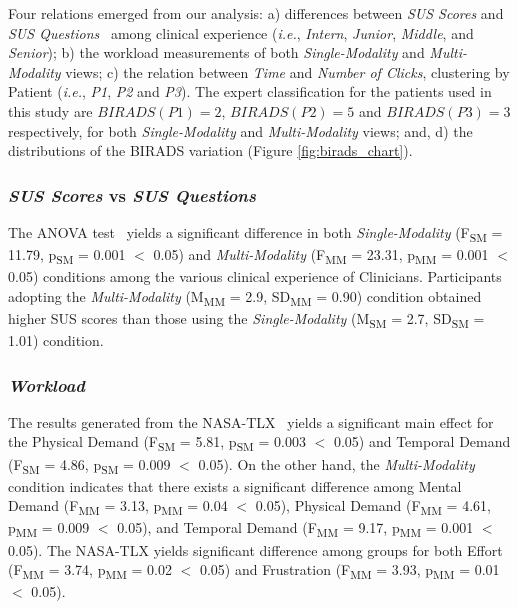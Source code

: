 Four relations emerged from our analysis:
a) differences between \textit{SUS Scores} and \textit{SUS Questions}~\cite{Tyllinen:2016:WNN:2858036.2858570} among clinical experience ({\em i.e.}, \textit{Intern}, \textit{Junior}, \textit{Middle}, and \textit{Senior});
b) the workload measurements of both \textit{Single-Modality} and \textit{Multi-Modality} views;
c) the relation between \textit{Time} and \textit{Number of Clicks}, clustering by Patient ({\em i.e.}, \textit{P1}, \textit{P2} and \textit{P3}).
The expert classification for the patients used in this study are $BIRADS(P1) = 2$, $BIRADS(P2) = 5$ and $BIRADS(P3) = 3$ respectively, for both \textit{Single-Modality} and \textit{Multi-Modality} views; and, d) the distributions of the BIRADS variation (Figure \ref{fig:birads_chart}).

\subsubsection{\textit{SUS Scores} vs \textit{SUS Questions}}

The ANOVA test\footnotemark[6]~\cite{Wobbrock:2011:ART:1978942.1978963} yields a significant difference in both \textit{Single-Modality} (F\textsubscript{SM} = 11.79, p\textsubscript{SM} = 0.001 $<$ 0.05) and \textit{Multi-Modality} (F\textsubscript{MM} = 23.31, p\textsubscript{MM} = 0.001 $<$ 0.05) conditions among the various clinical experience of Clinicians.
Participants adopting the \textit{Multi-Modality} (M\textsubscript{MM} = 2.9, SD\textsubscript{MM} = 0.90) condition obtained higher SUS scores than those using the \textit{Single-Modality} (M\textsubscript{SM} = 2.7, SD\textsubscript{SM} = 1.01) condition\footnotemark[7].


\subsubsection{\textit{Workload}}

The results generated from the NASA-TLX~\cite{10.1145/3290605.3300592} yields a significant main effect for the Physical Demand (F\textsubscript{SM} = 5.81, p\textsubscript{SM} = 0.003 $<$ 0.05) and Temporal Demand (F\textsubscript{SM} = 4.86, p\textsubscript{SM} = 0.009 $<$ 0.05).
On the other hand, the \textit{Multi-Modality} condition indicates that there exists a significant difference among Mental Demand (F\textsubscript{MM} = 3.13, p\textsubscript{MM} = 0.04 $<$ 0.05), Physical Demand (F\textsubscript{MM} = 4.61, p\textsubscript{MM} = 0.009 $<$ 0.05), and Temporal Demand (F\textsubscript{MM} = 9.17, p\textsubscript{MM} = 0.001 $<$ 0.05).
The NASA-TLX yields significant difference among groups for both Effort (F\textsubscript{MM} = 3.74, p\textsubscript{MM} = 0.02 $<$ 0.05) and Frustration (F\textsubscript{MM} = 3.93, p\textsubscript{MM} = 0.01 $<$ 0.05).

